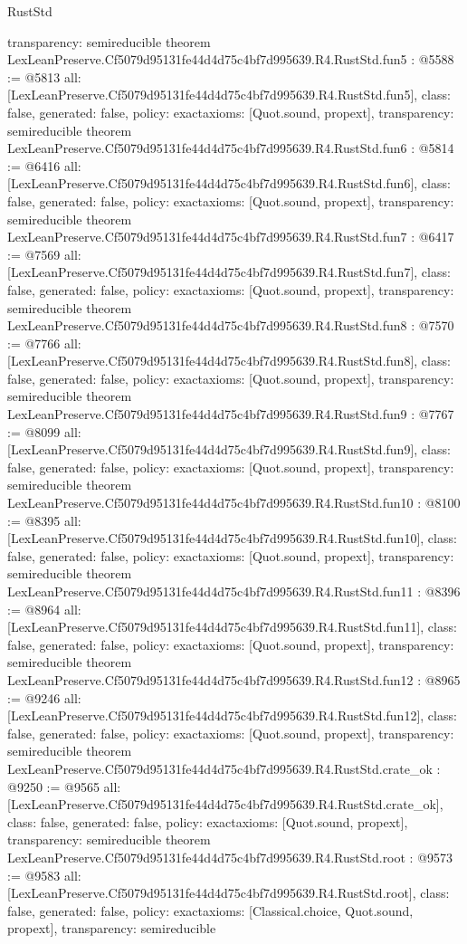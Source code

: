 \begin{lexlean}{RustStd}
\begin{coremodule}
{  transparency: semireducible
}
theorem LexLeanPreserve.Cf5079d95131fe44d4d75c4bf7d995639.R4.RustStd.fun5 : @5588 := @5813 {
  all: [LexLeanPreserve.Cf5079d95131fe44d4d75c4bf7d995639.R4.RustStd.fun5],
  class: false,
  generated: false,
  policy: exact{axioms: [Quot.sound, propext]},
  transparency: semireducible
}
theorem LexLeanPreserve.Cf5079d95131fe44d4d75c4bf7d995639.R4.RustStd.fun6 : @5814 := @6416 {
  all: [LexLeanPreserve.Cf5079d95131fe44d4d75c4bf7d995639.R4.RustStd.fun6],
  class: false,
  generated: false,
  policy: exact{axioms: [Quot.sound, propext]},
  transparency: semireducible
}
theorem LexLeanPreserve.Cf5079d95131fe44d4d75c4bf7d995639.R4.RustStd.fun7 : @6417 := @7569 {
  all: [LexLeanPreserve.Cf5079d95131fe44d4d75c4bf7d995639.R4.RustStd.fun7],
  class: false,
  generated: false,
  policy: exact{axioms: [Quot.sound, propext]},
  transparency: semireducible
}
theorem LexLeanPreserve.Cf5079d95131fe44d4d75c4bf7d995639.R4.RustStd.fun8 : @7570 := @7766 {
  all: [LexLeanPreserve.Cf5079d95131fe44d4d75c4bf7d995639.R4.RustStd.fun8],
  class: false,
  generated: false,
  policy: exact{axioms: [Quot.sound, propext]},
  transparency: semireducible
}
theorem LexLeanPreserve.Cf5079d95131fe44d4d75c4bf7d995639.R4.RustStd.fun9 : @7767 := @8099 {
  all: [LexLeanPreserve.Cf5079d95131fe44d4d75c4bf7d995639.R4.RustStd.fun9],
  class: false,
  generated: false,
  policy: exact{axioms: [Quot.sound, propext]},
  transparency: semireducible
}
theorem LexLeanPreserve.Cf5079d95131fe44d4d75c4bf7d995639.R4.RustStd.fun10 : @8100 := @8395 {
  all: [LexLeanPreserve.Cf5079d95131fe44d4d75c4bf7d995639.R4.RustStd.fun10],
  class: false,
  generated: false,
  policy: exact{axioms: [Quot.sound, propext]},
  transparency: semireducible
}
theorem LexLeanPreserve.Cf5079d95131fe44d4d75c4bf7d995639.R4.RustStd.fun11 : @8396 := @8964 {
  all: [LexLeanPreserve.Cf5079d95131fe44d4d75c4bf7d995639.R4.RustStd.fun11],
  class: false,
  generated: false,
  policy: exact{axioms: [Quot.sound, propext]},
  transparency: semireducible
}
theorem LexLeanPreserve.Cf5079d95131fe44d4d75c4bf7d995639.R4.RustStd.fun12 : @8965 := @9246 {
  all: [LexLeanPreserve.Cf5079d95131fe44d4d75c4bf7d995639.R4.RustStd.fun12],
  class: false,
  generated: false,
  policy: exact{axioms: [Quot.sound, propext]},
  transparency: semireducible
}
theorem LexLeanPreserve.Cf5079d95131fe44d4d75c4bf7d995639.R4.RustStd.crate_ok : @9250 := @9565 {
  all: [LexLeanPreserve.Cf5079d95131fe44d4d75c4bf7d995639.R4.RustStd.crate_ok],
  class: false,
  generated: false,
  policy: exact{axioms: [Quot.sound, propext]},
  transparency: semireducible
}
theorem LexLeanPreserve.Cf5079d95131fe44d4d75c4bf7d995639.R4.RustStd.root : @9573 := @9583 {
  all: [LexLeanPreserve.Cf5079d95131fe44d4d75c4bf7d995639.R4.RustStd.root],
  class: false,
  generated: false,
  policy: exact{axioms: [Classical.choice, Quot.sound, propext]},
  transparency: semireducible
}


\end{coremodule}
\end{lexlean}
